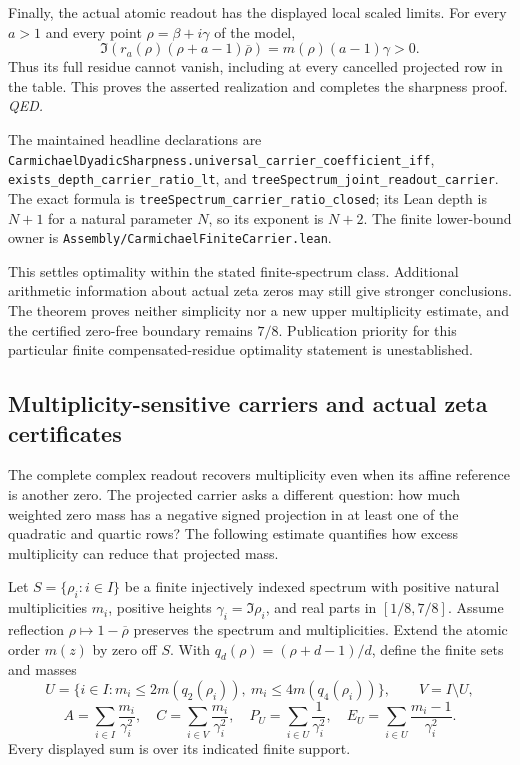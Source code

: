 Finally, the actual atomic readout has the displayed local scaled limits.
For every \(a>1\) and every point \(\rho=\beta+i\gamma\) of the model,
\[
 \Im\!\left(r_a(\rho)(\rho+a-1)\overline\rho\right)
   =m(\rho)(a-1)\gamma>0.
\]
Thus its full residue cannot vanish, including at every cancelled
projected row in the table. This proves the asserted realization and
completes the sharpness proof.
\hfill\textit{QED.}

The maintained headline declarations are
\texttt{CarmichaelDyadicSharpness.universal\_carrier\_coefficient\_iff},
\texttt{exists\_depth\_carrier\_ratio\_lt}, and
\texttt{treeSpectrum\_joint\_readout\_carrier}.
The exact formula is
\texttt{treeSpectrum\_carrier\_ratio\_closed}; its Lean depth is \(N+1\)
for a natural parameter \(N\), so its exponent is \(N+2\).
The finite lower-bound owner is
\texttt{Assembly/CarmichaelFiniteCarrier.lean}.

This settles optimality within the stated finite-spectrum class.
Additional arithmetic information about actual zeta zeros may still
give stronger conclusions. The theorem proves neither simplicity nor
a new upper multiplicity estimate, and the certified zero-free boundary
remains \(7/8\). Publication priority for this particular finite
compensated-residue optimality statement is unestablished.

\subsection{Multiplicity-sensitive carriers and actual zeta certificates}
\label{sec:multiplicity-sensitive-carriers}

The complete complex readout recovers multiplicity even when its affine
reference is another zero. The projected carrier asks a different question:
how much weighted zero mass has a negative signed projection in at least one
of the quadratic and quartic rows? The following estimate quantifies how
excess multiplicity can reduce that projected mass.

Let \(S=\{\rho_i:i\in I\}\) be a finite injectively indexed spectrum with
positive natural multiplicities \(m_i\), positive heights
\(\gamma_i=\Im\rho_i\), and real parts in \([1/8,7/8]\).
Assume reflection \(\rho\mapsto1-\overline\rho\) preserves the spectrum
and multiplicities. Extend the atomic order \(m(z)\) by zero off \(S\).
With \(q_d(\rho)=(\rho+d-1)/d\), define the finite sets and masses
\[
 U=\{i\in I:m_i\le2m(q_2(\rho_i)),\
                   m_i\le4m(q_4(\rho_i))\},\qquad V=I\setminus U,
\]
\[
 A=\sum_{i\in I}\frac{m_i}{\gamma_i^2},\quad
 C=\sum_{i\in V}\frac{m_i}{\gamma_i^2},\quad
 P_U=\sum_{i\in U}\frac1{\gamma_i^2},\quad
 E_U=\sum_{i\in U}\frac{m_i-1}{\gamma_i^2}.
\]
Every displayed sum is over its indicated finite support.

